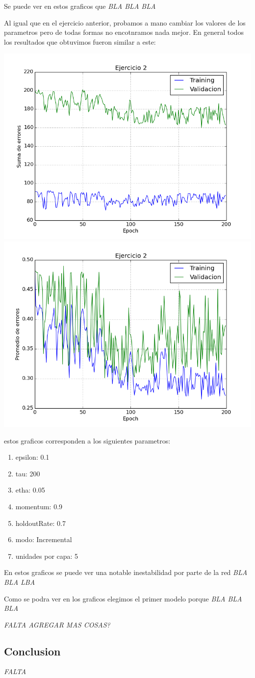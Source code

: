 Se puede ver en estos graficos que \emph{\color{red} BLA BLA BLA}

Al igual que en el ejercicio anterior, probamos a mano cambiar los valores de los parametros pero de todas formas no encotnramos nada mejor. En general todos los resultados que obtuvimos fueron similar a este:

\includegraphics[scale=0.4]{img/ej20050915sum}
\includegraphics[scale=0.4]{img/ej20050915mean}

estos graficos corresponden a los siguientes parametros:

\begin{enumerate}
\item epsilon: 0.1
\item tau: 200
\item etha: 0.05
\item momentum: 0.9
\item holdoutRate: 0.7
\item modo: Incremental
\item unidades por capa: 5
\end{enumerate}
En estos graficos se puede ver una notable inestabilidad por parte de la red \emph{\color{red} BLA BLA LBA}

Como se podra ver en los graficos elegimos el primer modelo porque \emph{\color{red} BLA BLA BLA}

\emph{\color{red} FALTA AGREGAR MAS COSAS?}
\subsection{Conclusion}

\emph{\color{red} FALTA }
